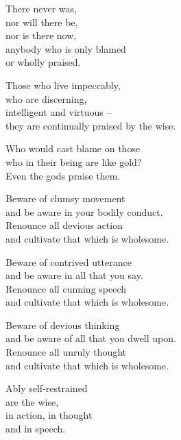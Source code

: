 There never was,\\
nor will there be,\\
nor is there now,\\
anybody who is only blamed\\
or wholly praised.


Those who live impeccably,\\
who are discerning,\\
intelligent and virtuous --\\
they are continually praised by the wise.


Who would cast blame on those\\
who in their being are like gold?\\
Even the gods praise them.


Beware of clumsy movement\\
and be aware in your bodily conduct.\\
Renounce all devious action\\
and cultivate that which is wholesome.


Beware of contrived utterance\\
and be aware in all that you say.\\
Renounce all cunning speech\\
and cultivate that which is wholesome.


Beware of devious thinking\\
and be aware of all that you dwell upon.\\
Renounce all unruly thought\\
and cultivate that which is wholesome.


Ably self-restrained\\
are the wise,\\
in action, in thought\\
and in speech.

